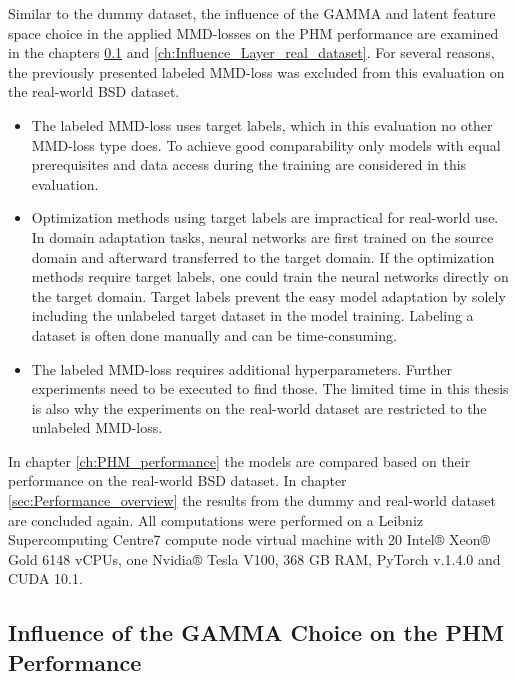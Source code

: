 Similar to the dummy dataset, the influence of the GAMMA and latent feature space choice in the applied MMD-losses on the PHM performance are examined in the chapters \ref{ch:Influence_GAMMA_real_dataset} and \ref{ch:Influence_Layer_real_dataset}. For several reasons, the previously presented labeled MMD-loss was excluded from this evaluation on the real-world BSD dataset. 
\begin{itemize}
    \item The labeled MMD-loss uses target labels, which in this evaluation no other MMD-loss type does. To achieve good comparability only models with equal prerequisites and data access during the training are considered in this evaluation.
    \item Optimization methods using target labels are impractical for real-world use. In domain adaptation tasks, neural networks are first trained on the source domain and afterward transferred to the target domain. If the optimization methods require target labels, one could train the neural networks directly on the target domain. Target labels prevent the easy model adaptation by solely including the unlabeled target dataset in the model training. Labeling a dataset is often done manually and can be time-consuming.
    \item The labeled MMD-loss requires additional hyperparameters. Further experiments need to be executed to find those. The limited time in this thesis is also why the experiments on the real-world dataset are restricted to the unlabeled MMD-loss. 
\end{itemize}

In chapter \ref{ch:PHM_performance} the models are compared based on their performance on the real-world BSD dataset. In chapter \ref{sec:Performance_overview} the results from the dummy and real-world dataset are concluded again. All computations were performed on a Leibniz Supercomputing Centre7 compute node virtual machine with 20 Intel® Xeon® Gold 6148 vCPUs, one Nvidia® Tesla V100, 368 GB RAM, PyTorch v.1.4.0 and CUDA 10.1.


\subsection{Influence of the GAMMA Choice on the PHM Performance}\label{ch:Influence_GAMMA_real_dataset}

